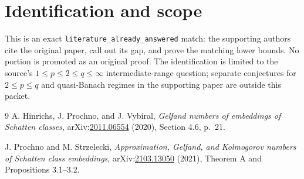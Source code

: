 \documentclass[11pt]{article}
\begin{document}
\section*{Identification and scope}

This is an exact \texttt{literature\_already\_answered} match: the supporting
authors cite the original paper, call out its gap, and prove the matching
lower bounds. No portion is promoted as an original proof. The identification
is limited to the source's $1\leq p\leq2\leq q\leq\infty$ intermediate-range
question; separate conjectures for $2\leq p\leq q$ and quasi-Banach regimes in
the supporting paper are outside this packet.

\begin{thebibliography}{9}
A. Hinrichs, J. Prochno, and J. Vyb\'iral,
\emph{Gelfand numbers of embeddings of Schatten classes},
arXiv:\href{https://arxiv.org/abs/2011.06554}{2011.06554} (2020),
Section 4.6, p.~21.

J. Prochno and M. Strzelecki,
\emph{Approximation, Gelfand, and Kolmogorov numbers of Schatten class
embeddings},
arXiv:\href{https://arxiv.org/abs/2103.13050}{2103.13050} (2021),
Theorem A and Propositions 3.1--3.2.
\end{thebibliography}
\end{document}
